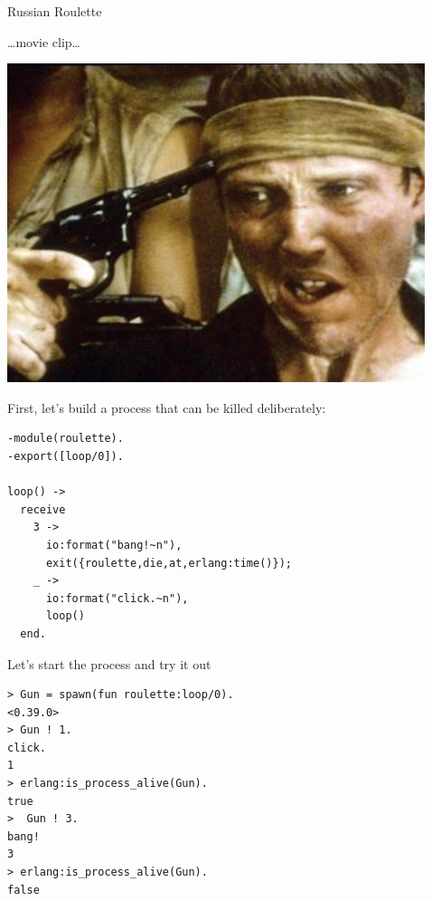 \documentclass[12pt,xcolor=svgnames]{beamer}
\begin{document}
\begin{frame}{Russian Roulette}

\centerline{\ldots movie clip\ldots}

\framebreak

\centerline{\includegraphics[scale=0.4]{images/1978-walken.png}}
\framebreak

First, let's build a process that can be killed deliberately:
\begin{Verbatim}
-module(roulette).
-export([loop/0]).

loop() ->
  receive
    3 -> 
      io:format("bang!~n"),
      exit({roulette,die,at,erlang:time()});
    _ -> 
      io:format("click.~n"),
      loop()
  end.			
\end{Verbatim}

\framebreak

Let's start the process and try it out
\begin{Verbatim}
> Gun = spawn(fun roulette:loop/0).
<0.39.0>
> Gun ! 1.
click.
1
> erlang:is_process_alive(Gun).
true
>  Gun ! 3.
bang!
3
> erlang:is_process_alive(Gun).
false
\end{Verbatim}
\end{frame}
\end{document}
